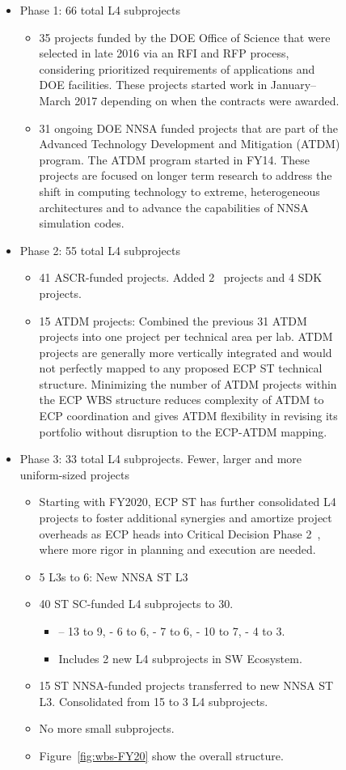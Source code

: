 \begin{figure}
\begin{mdframed}
\begin{itemize}
\item Phase 1: 66 total L4 subprojects
\begin{itemize}
\item 35 projects funded by the DOE Office of Science that were selected in late 2016 via an RFI and RFP process, considering prioritized requirements of applications and DOE facilities. 
These projects started work in January–March 2017 depending on when the contracts were awarded.
\item 31 ongoing DOE NNSA funded projects that are part of the Advanced Technology Development and Mitigation (ATDM) program. The ATDM program started in FY14.  These projects are focused on longer term research to address the shift in computing technology to extreme, heterogeneous architectures and to advance the capabilities of NNSA simulation codes.
\end{itemize}
\item Phase 2: 55 total L4 subprojects
\begin{itemize}
\item 41 ASCR-funded projects.  Added  2 \ecosystem\ projects and 4 SDK projects.
\item 15 ATDM projects: Combined the previous 31 ATDM projects into one project per technical area per lab.  ATDM projects are generally more vertically integrated and would not perfectly mapped to any proposed ECP ST technical structure.  Minimizing the number of ATDM projects within the ECP WBS structure reduces complexity of ATDM to ECP coordination and gives ATDM flexibility in revising its portfolio without disruption to the ECP-ATDM mapping.
\end{itemize}
\item Phase 3: 33 total L4 subprojects.  Fewer, larger and more uniform-sized projects
\begin{itemize}
	\item Starting with FY2020, ECP ST has further consolidated L4 projects to foster additional synergies and amortize project overheads as ECP heads into Critical Decision Phase 2~\cite{413.3B}, where more rigor in planning and execution are needed.
	\item 5 L3s to 6: New NNSA ST L3
	\item 40 ST SC-funded L4 subprojects to 30.
	\begin{itemize}
	\item \pmr – 13 to 9, \tools - 6 to 6, \mathlibs - 7 to 6, \dataviz - 10 to 7, \ecosystem - 4 to 3.
	\item Includes 2 new L4 subprojects in SW Ecosystem.
	\end{itemize}
	\item 15 ST NNSA-funded projects transferred to new NNSA ST L3. Consolidated from 15 to 3 L4 subprojects.
	\item No more small subprojects.
	\item Figure~\ref{fig:wbs-FY20} show the overall structure.
\end{itemize}
\end{itemize}
\end{mdframed}


\end{figure}
